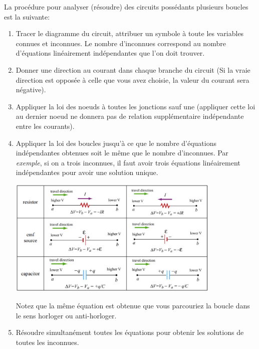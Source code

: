 \documentclass[a4paper]{article}
\begin{document}
La procédure pour analyser (résoudre) des circuits possédants plusieurs boucles est la suivante: 
\begin{enumerate}
    \item Tracer le diagramme du circuit, attribuer un symbole à toute les variables connues et inconnues. Le nombre d'inconnues 
correspond au nombre d'équations linéairement indépendantes que l'on doit trouver.
    \item Donner une direction au courant dans chaque branche du circuit (Si la vraie direction est opposée à celle que vous avez choisie,
la valeur du courant sera négative).
    \item Appliquer la loi des noeuds à toutes les jonctions sauf une (appliquer cette loi au dernier noeud ne donnera pas de relation
supplémentaire indépendante entre les courants).
    \item Appliquer la loi des boucles jusqu'à ce que le nombre d'équations indépendantes obtenues soit le même que le nombre d'inconnues.
\newline Par \emph{exemple}, si on a trois inconnues, il faut avoir trois équations linéairement indépendantes pour avoir une solution unique.
\begin{center} \includegraphics[width=0.8\textwidth]{Kirchhoff.PNG} \end{center}
Notez que la même équation est obtenue que vous parcouriez la boucle dans le sens horloger ou anti-horloger.
    \item Résoudre simultanément toutes les équations pour obtenir les solutions de toutes les inconnues.
\end{enumerate}
\end{document}
